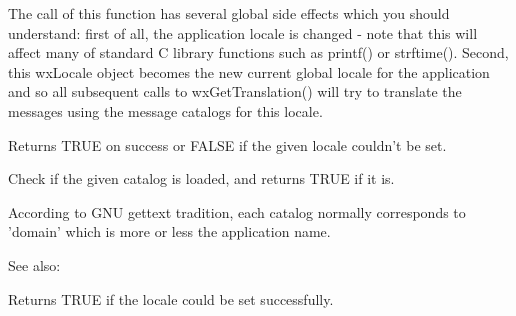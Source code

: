 The call of this function has several global side effects which you should
understand: first of all, the application locale is changed - note that this
will affect many of standard C library functions such as printf() or strftime().
Second, this wxLocale object becomes the new current global locale for the
application and so all subsequent calls to wxGetTranslation() will try to
translate the messages using the message catalogs for this locale.

Returns TRUE on success or FALSE if the given locale couldn't be set.

\label{wxlocaleisloaded}


Check if the given catalog is loaded, and returns TRUE if it is.

According to GNU gettext tradition, each catalog
normally corresponds to 'domain' which is more or less the application name.

See also: 

\label{wxlocaleisok}


Returns TRUE if the locale could be set successfully.

